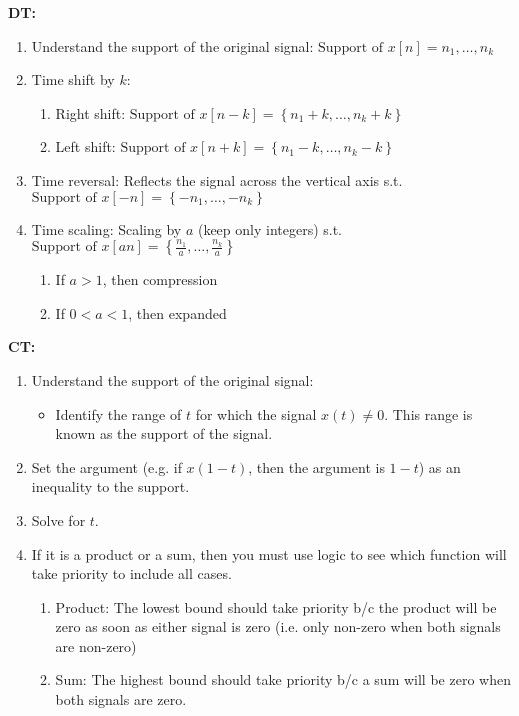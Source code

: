 \begin{process}
    \textbf{DT:}
    \begin{enumerate}
        \item Understand the support of the original signal: $\text{Support of } x[n] = {n_1,\ldots,n_k}$
        \item Time shift by $k$:
        \begin{enumerate}
            \item Right shift: $\text{Support of } x[n-k] = \left\{ n_1 + k, \ldots, n_k + k \right\}$
            \item Left shift: $\text{Support of } x[n+k] = \left\{ n_1 - k, \ldots, n_k - k \right\}$
        \end{enumerate}
        \item Time reversal: Reflects the signal across the vertical axis s.t. $\text{Support of } x[-n] = \left\{ -n_1 , \ldots, -n_k \right\}$
        \item Time scaling: Scaling by $a$ (keep only integers) s.t. $\text{Support of } x[an] = \left\{ \frac{n_1}{a}, \ldots, \frac{n_k}{a} \right\}$
        \begin{enumerate}
            \item If $a>1$, then compression
            \item If $0<a<1$, then expanded
        \end{enumerate}
    \end{enumerate}
    \vspace{1em}

    \textbf{CT:}
    \begin{enumerate}
        \item Understand the support of the original signal:
        \begin{itemize}
            \item Identify the range of \( t \) for which the signal \( x(t) \neq 0 \). This range is known as the support of the signal.
        \end{itemize}
        \item Set the argument (e.g. if $x(1-t)$, then the argument is $1-t$) as an inequality to the support. 
        \item Solve for $t$.
        \item If it is a product or a sum, then you must use logic to see which function will take priority to include all cases. 
        \begin{enumerate}
            \item Product: The lowest bound should take priority b/c the product will be zero as soon as either signal is zero (i.e. only non-zero when both signals are non-zero)
            \item Sum: The highest bound should take priority b/c a sum will be zero when both signals are zero. 
        \end{enumerate}
    \end{enumerate}
\end{process}

